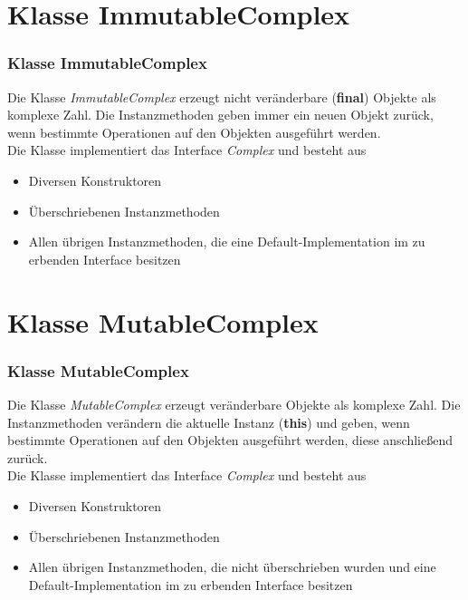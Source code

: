 \documentclass{beamer}
\begin{document}
\section{Klasse ImmutableComplex}
\begin{frame}
\frametitle{Klasse ImmutableComplex}

Die Klasse \textit{ImmutableComplex} erzeugt nicht ver\"anderbare (\textbf{final}) Objekte als komplexe Zahl.
Die Instanzmethoden geben immer ein neuen Objekt zur\"uck, wenn bestimmte Operationen auf den Objekten ausgef\"uhrt werden.\\

Die Klasse implementiert das Interface \textit{Complex} und besteht aus
\begin{itemize}
\setlength{\itemsep}{12pt}
\item Diversen Konstruktoren
\item \"Uberschriebenen Instanzmethoden
\item Allen \"ubrigen Instanzmethoden, die eine Default-Implementation im zu erbenden Interface besitzen
\end{itemize}

\end{frame}

\section{Klasse MutableComplex}
\begin{frame}
\frametitle{Klasse MutableComplex}

Die Klasse \textit{MutableComplex} erzeugt ver\"anderbare Objekte als komplexe Zahl.
Die Instanzmethoden ver\"andern die aktuelle Instanz (\textbf{this}) und geben, wenn bestimmte Operationen auf den Objekten ausgef\"uhrt werden,
diese anschließend zur\"uck.\\

Die Klasse implementiert das Interface \textit{Complex} und besteht aus
\begin{itemize}
\setlength{\itemsep}{12pt}
\item Diversen Konstruktoren
\item \"Uberschriebenen Instanzmethoden
\item Allen \"ubrigen Instanzmethoden, die nicht \"uberschrieben wurden und eine Default-Implementation im zu erbenden Interface besitzen
\end{itemize}

\end{frame}
\end{document}
